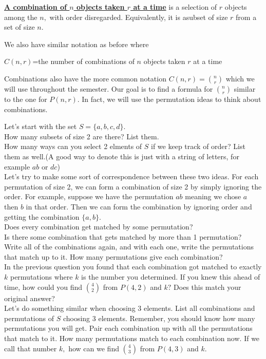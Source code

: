 \documentclass[14,fleqn]{article}
\newcommand{\defn}[1]{\textbf{\underline{#1}}}
\begin{document}
\defn{A combination of $n$ objects taken $r$ at a time} is a selection of $r$ objects among the $n,$ with order disregarded. Equivalently, it is asubset of size $r$ from a set of size $n.$

We also have similar notation as before where
\begin{center}
	$C(n,r)$=the number of combinations of $n$ objects taken $r$ at a time
\end{center}

Combinations also have the more common notation $C(n,r)=\binom{n}{r}$ which we will use throughout the semester. Our goal is to find a formula for $\binom{n}{r}$ similar to the one for $P(n,r).$ In fact, we will use the permutation ideas to think about combinations.

Let's start with the set $S=\{a,b,c,d\}.$\\
How many subsets of size 2 are there? List them.\\[.6 in]

How many ways can you select 2 elments of $S$ if we keep track of order? List them as well.(A good way to denote this is just with a string of letters, for example $ab$ or $dc$)\\[.6 in]

Let's try to make some sort of correspondence between these two ideas. For each permutation of size 2, we can form a combination of size 2 by simply ignoring the order. For example, suppose we have the permutation $ab$ meaning we chose $a$ then $b$ in that order. Then we can form the combination by ignoring order and getting the combination $\{a,b\}.$\\
Does every combination get matched by some permutation?\\[.3 in]
Is there some combination that gets matched by more than 1 permutation?\\[.3 in]
\newpage
Write all of the combinations again, and with each one, write the permutations that match up to it. How many permutations give each combination?\\[.8 in]


In the previous question you found that each combination got matched to exactly $k$ permutations where $k$ is the number you determined. If you knew this ahead of time, how could you find $\binom{4}{2}$ from $P(4,2)$ and $k?$ Does this match your original answer?\\[.4 in]

Let's do something similar when choosing 3 elements. List all combinations and permutations of $S$ choosing 3 elements. Remember, you should know how many permutations you will get. Pair each combination up with all the permutations that match to it. How many permutations match to each combination now. If we call that number $k,$ how can we find $\binom{4}{3}$ from $P(4,3)$ and $k.$\\[1.4 in]
\end{document}
